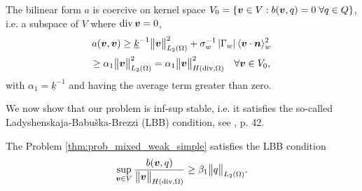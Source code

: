The bilinear form $a$ is coercive on kernel space $V_0=\{\mathbf{\boldsymbol{v}}\in V: b(\mathbf{\boldsymbol{v}},q)=0\;\forall q\in Q\}$, i.e.
a subspace of $V$ where ${\rm div}\,\mathbf{\boldsymbol{v}}=0$,
\begin{multline} \label{eqn:form_a_coercivity_V0}
    a(\mathbf{\boldsymbol{v}},\mathbf{\boldsymbol{v}}) \geq \underline{k}^{-1} \bigl\Vert\mathbf{\boldsymbol{v}}\bigr\Vert^2_{L_2(\Omega)}
                + \sigma_w^{-1}\left|\Gamma_w\right|\langle\mathbf{\boldsymbol{v}}\cdot\mathbf{\boldsymbol{n}}\rangle_w^2 \\
        \geq  \alpha_1 \bigl\Vert\mathbf{\boldsymbol{v}}\bigr\Vert^2_{L_2(\Omega)} = \alpha_1 \bigl\Vert\mathbf{\boldsymbol{v}}\bigr\Vert^2_{H({\rm div},\Omega)} \quad \forall \mathbf{\boldsymbol{v}}\in V_0,
\end{multline}
with $\alpha_1=\underline{k}^{-1}$ and having the average term greater than zero.

We now show that our problem is inf-sup stable, i.e. it satisfies 
the so-called Ladyshenskaja-Babu{\v s}ka-Brezzi (LBB) condition, see \cite{brezzi_mixed_1991}, p. 42.

\begin{lemma} \label{lem:mixed_lbb}
The Problem \ref{thm:prob_mixed_weak_simple} satisfies the LBB condition
\begin{equation} \label{eqn:form_b_lbb}
    \sup_{\mathbf{\boldsymbol{v}}\in V} \frac{b(\mathbf{\boldsymbol{v}},q)}{\bigl\Vert\mathbf{\boldsymbol{v}}\bigr\Vert_{H({\rm div},\Omega)}} \geq \beta_1 \bigl\Vert q\bigr\Vert_{L_2(\Omega)}.
\end{equation}
\end{lemma}

